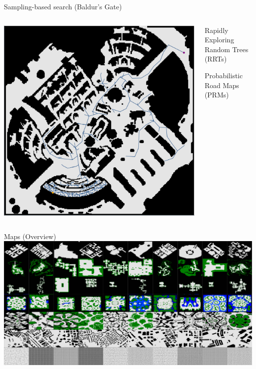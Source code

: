 \documentclass[aspectratio=169]{beamer}
\makeatletter
\renewcommand{\white}[1]{{\color{pureminimalistic@text@white} #1}}
\renewcommand{\red}[1]{{\color{pureminimalistic@text@red} #1}}
\makeatother
\begin{document}
\begin{frame}[plain]{Sampling-based search \white{(Baldur's Gate)}}
  \begin{columns}[T]
      \begin{column}{.4\linewidth}
      \includegraphics[height=0.8\textheight, keepaspectratio]{figures/baldurs_rrt_one_off.pdf}
      \end{column}
      \begin{column}{.6\linewidth}
          \begin{vfilleditems}
              \item {\Large Rapidly Exploring Random Trees \red{(RRTs)}}
              \vspace{1em}
              \item {\Large Probabilistic Road Maps \red{(PRMs)}}
          \end{vfilleditems}
      \end{column}
  \end{columns}
\end{frame}

\begin{frame}{Maps (Overview)}
    \includegraphics[width=0.95\linewidth, keepaspectratio]{figures/show_maps_overview.pdf}
\end{frame}
\end{document}
